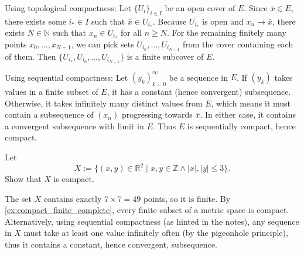 \begin{exercisesolution}
Using topological compactness: Let $\{U_i\}_{i \in I}$ be an open cover of $E$. Since $\bar{x} \in E$, there exists some $i_* \in I$ such that $\bar{x} \in U_{i_*}$. Because $U_{i_*}$ is open and $x_n \to \bar{x}$, there exists $N \in \mathbb{N}$ such that $x_n \in U_{i_*}$ for all $n \geq N$. For the remaining finitely many points $x_0, \dots, x_{N-1}$, we can pick sets $U_{i_0}, \dots, U_{i_{N-1}}$ from the cover containing each of them. Then $\{U_{i_*}, U_{i_0}, \dots, U_{i_{N-1}}\}$ is a finite subcover of $E$.

Using sequential compactness: Let $(y_k)_{k=0}^\infty$ be a sequence in $E$. If $(y_k)$ takes values in a finite subset of $E$, it has a constant (hence convergent) subsequence. Otherwise, it takes infinitely many distinct values from $E$, which means it must contain a subsequence of $(x_n)$ progressing towards $\bar{x}$. In either case, it contains a convergent subsequence with limit in $E$. Thus $E$ is sequentially compact, hence compact.
\end{exercisesolution}

\begin{exercise}
\label{ex:finite_set_compact}
Let 
\[X := \big\{ (x,y) \in \mathbb{R}^2 \mid x,y \in \mathbb{Z} \wedge |x|,|y| \leq 3 \big\}.\]
Show that $X$ is compact.
\end{exercise}

\begin{exercisesolution}
The set $X$ contains exactly $7 \times 7 = 49$ points, so it is finite. By \cref{ex:compact_finite_complete}, every finite subset of a metric space is compact. Alternatively, using sequential compactness (as hinted in the notes), any sequence in $X$ must take at least one value infinitely often (by the pigeonhole principle), thus it contains a constant, hence convergent, subsequence.
\end{exercisesolution}

